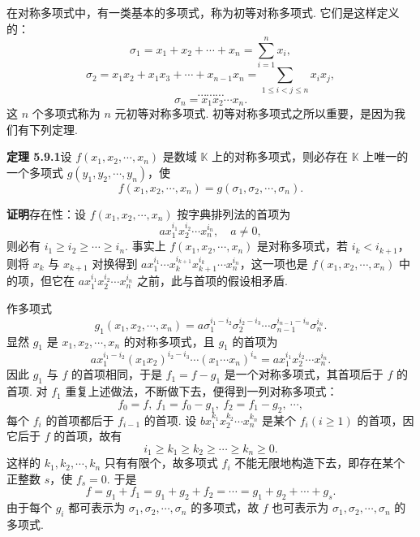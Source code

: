 \documentclass[UTF8, 12pt, fontset=fandol, oneside]{ctexart}
\begin{document}
在对称多项式中，有一类基本的多项式，称为初等对称多项式. 它们是这样定义的：
\[
\sigma_1=x_1+x_2+\cdots+x_n=\sum_{i=1}^n x_i,
\]
\[
\sigma_2=x_1x_2+x_1x_3+\cdots+x_{n-1}x_n=\sum_{1\leq i<j\leq n}x_ix_j,
\]
\[
\cdots\cdots\cdots
\]
\[
\sigma_n=x_1x_2\cdots x_n.
\]
这 $n$ 个多项式称为 $n$ 元初等对称多项式. 初等对称多项式之所以重要，是因为我们有下列定理.

\noindent\textbf{定理 5.9.1}\quad 设 $f(x_1,x_2,\cdots,x_n)$ 是数域 $\mathbb{K}$ 上的对称多项式，则必存在 $\mathbb{K}$ 上唯一的一个多项式 $g(y_1,y_2,\cdots,y_n)$，使
\[
f(x_1,x_2,\cdots,x_n)=g(\sigma_1,\sigma_2,\cdots,\sigma_n).
\]

\noindent\textbf{证明}\quad 存在性：设 $f(x_1,x_2,\cdots,x_n)$ 按字典排列法的首项为
\[
ax_1^{i_1}x_2^{i_2}\cdots x_n^{i_n},\quad a\neq 0,
\]
则必有 $i_1\geq i_2\geq \cdots\geq i_n$. 事实上 $f(x_1,x_2,\cdots,x_n)$ 是对称多项式，若 $i_k<i_{k+1}$，则将 $x_k$ 与 $x_{k+1}$ 对换得到 $ax_1^{i_1}\cdots x_k^{i_{k+1}}x_{k+1}^{i_k}\cdots x_n^{i_n}$，这一项也是 $f(x_1,x_2,\cdots,x_n)$ 中的项，但它在 $ax_1^{i_1}x_2^{i_2}\cdots x_n^{i_n}$ 之前，此与首项的假设相矛盾.

作多项式
\[
g_1(x_1,x_2,\cdots,x_n)=a\sigma_1^{i_1-i_2}\sigma_2^{i_2-i_3}\cdots\sigma_{n-1}^{i_{n-1}-i_n}\sigma_n^{i_n}.
\]
显然 $g_1$ 是 $x_1,x_2,\cdots,x_n$ 的对称多项式，且 $g_1$ 的首项为
\[
ax_1^{i_1-i_2}(x_1x_2)^{i_2-i_3}\cdots(x_1\cdots x_n)^{i_n}
=ax_1^{i_1}x_2^{i_2}\cdots x_n^{i_n}.
\]
因此 $g_1$ 与 $f$ 的首项相同，于是 $f_1=f-g_1$ 是一个对称多项式，其首项后于 $f$ 的首项. 对 $f_1$ 重复上述做法，不断做下去，便得到一列对称多项式：
\[
f_0=f,\ f_1=f_0-g_1,\ f_2=f_1-g_2,\ \cdots,
\]
每个 $f_i$ 的首项都后于 $f_{i-1}$ 的首项. 设 $bx_1^{k_1}x_2^{k_2}\cdots x_n^{k_n}$ 是某个 $f_i(i\geq 1)$ 的首项，因它后于 $f$ 的首项，故有
\[
i_1\geq k_1\geq k_2\geq \cdots\geq k_n\geq 0.
\]
这样的 $k_1,k_2,\cdots,k_n$ 只有有限个，故多项式 $f_i$ 不能无限地构造下去，即存在某个正整数 $s$，使 $f_s=0$. 于是
\[
f=g_1+f_1=g_1+g_2+f_2=\cdots=g_1+g_2+\cdots+g_s.
\]
由于每个 $g_i$ 都可表示为 $\sigma_1,\sigma_2,\cdots,\sigma_n$ 的多项式，故 $f$ 也可表示为 $\sigma_1,\sigma_2,\cdots,\sigma_n$ 的多项式.
\end{document}
